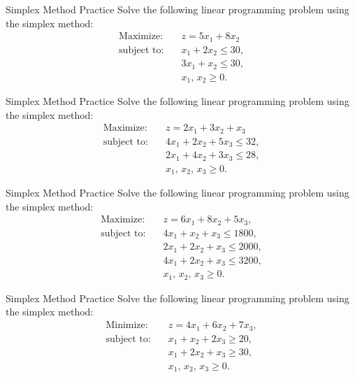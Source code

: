 \begin{ex}{Simplex Method Practice}{}
\label{ex:simplex-practice-5-8}
 Solve the following linear programming problem using the simplex method:
\[
\begin{aligned}
\text{Maximize:}\quad & z = 5x_{1} + 8x_{2}\\
\text{subject to:}\quad & x_{1} + 2x_{2} \le 30,\\
& 3x_{1} + x_{2} \le 30,\\
& x_{1},\, x_{2} \ge 0.
\end{aligned}
\]
\exrefs{\S\ref{sec:pivoting}; \S\ref{sec:simplex-algorithm}}
\end{ex}

\begin{ex}{Simplex Method Practice}{}
\label{ex:simplex-practice-3var-1}
 Solve the following linear programming problem using the simplex method:
\[
\begin{aligned}
\text{Maximize:}\quad & z = 2x_{1} + 3x_{2} + x_{3} \\
\text{subject to:}\quad & 4x_{1} + 2x_{2} + 5x_{3} \le 32,\\
& 2x_{1} + 4x_{2} + 3x_{3} \le 28,\\
& x_{1},\, x_{2},\, x_{3} \ge 0.
\end{aligned}
\]
\exrefs{\S\ref{sec:pivoting}; \S\ref{sec:simplex-algorithm}}
\end{ex}

\begin{ex}{Simplex Method Practice}{}
\label{ex:simplex-practice-3var-2}
 Solve the following linear programming problem using the simplex method:
\[
\begin{aligned}
\text{Maximize:}\quad & z = 6x_{1} + 8x_{2} + 5x_{3},\\
\text{subject to:}\quad & 4x_{1} + x_{2} + x_{3} \le 1800,\\
& 2x_{1} + 2x_{2} + x_{3} \le 2000,\\
& 4x_{1} + 2x_{2} + x_{3} \le 3200,\\
& x_{1},\, x_{2},\, x_{3} \ge 0.
\end{aligned}
\]
\exrefs{\S\ref{sec:pivoting}; \S\ref{sec:simplex-algorithm}}
\end{ex}

\begin{ex}{Simplex Method Practice}{}
\label{ex:simplex-bigm-practice-1}
 Solve the following linear programming problem using the simplex method:
\[
\begin{aligned}
\text{Minimize:}\quad & z = 4x_{1} + 6x_{2} + 7x_{3}, \\
\text{subject to:}\quad & x_{1} + x_{2} + 2x_{3} \ge 20,\\
& x_{1} + 2x_{2} + x_{3} \ge 30,\\
& x_{1},\, x_{2},\, x_{3} \ge 0.
\end{aligned}
\]
\exrefs{\S\ref{sec:big-m-dictionary}}
\end{ex}

